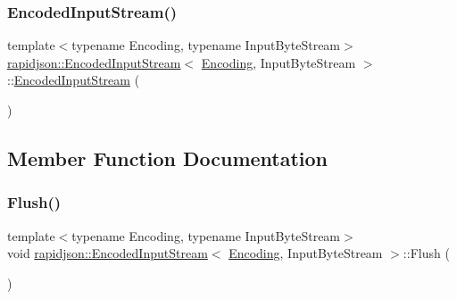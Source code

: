 \subsubsection{\texorpdfstring{EncodedInputStream()}{EncodedInputStream()}\hspace{0.1cm}{\footnotesize\ttfamily [2/2]}}
{\footnotesize\ttfamily template$<$typename Encoding, typename Input\+Byte\+Stream$>$ \\
\mbox{\hyperlink{classrapidjson_1_1_encoded_input_stream}{rapidjson\+::\+Encoded\+Input\+Stream}}$<$ \mbox{\hyperlink{classrapidjson_1_1_encoding}{Encoding}}, Input\+Byte\+Stream $>$\+::\mbox{\hyperlink{classrapidjson_1_1_encoded_input_stream}{Encoded\+Input\+Stream}} (\begin{DoxyParamCaption}\item[{const \mbox{\hyperlink{classrapidjson_1_1_encoded_input_stream}{Encoded\+Input\+Stream}}$<$ \mbox{\hyperlink{classrapidjson_1_1_encoding}{Encoding}}, Input\+Byte\+Stream $>$ \&}]{ }\end{DoxyParamCaption})\hspace{0.3cm}{\ttfamily [private]}}



\subsection{Member Function Documentation}
\mbox{\label{classrapidjson_1_1_encoded_input_stream_a56f9a8c6636976e173f41f88f0028dbb}} 
\subsubsection{\texorpdfstring{Flush()}{Flush()}}
{\footnotesize\ttfamily template$<$typename Encoding, typename Input\+Byte\+Stream$>$ \\
void \mbox{\hyperlink{classrapidjson_1_1_encoded_input_stream}{rapidjson\+::\+Encoded\+Input\+Stream}}$<$ \mbox{\hyperlink{classrapidjson_1_1_encoding}{Encoding}}, Input\+Byte\+Stream $>$\+::Flush (\begin{DoxyParamCaption}{ }\end{DoxyParamCaption})}



